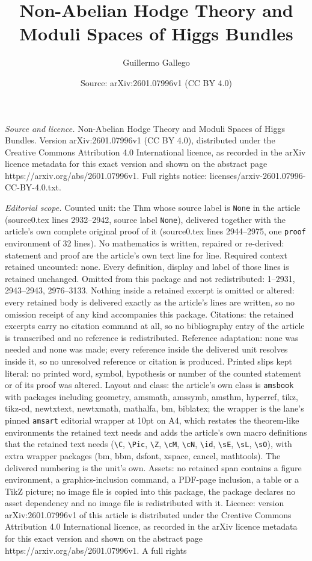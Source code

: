 \documentclass[10pt,a4paper]{amsart}
\title[Non-Abelian Hodge Theory and Moduli Spaces of Higgs Bundles]{Non-Abelian Hodge Theory and Moduli Spaces of Higgs Bundles}
\author{Guillermo Gallego}
\date{Source: arXiv:2601.07996v1 (CC BY 4.0)}
\begin{document}
\maketitle

\noindent\emph{Source and licence.} Non-Abelian Hodge Theory and Moduli Spaces of Higgs Bundles. Version arXiv:2601.07996v1 (CC BY 4.0), distributed under the Creative Commons Attribution 4.0 International licence, as recorded in the arXiv licence metadata for this exact version and shown on the abstract page https://arxiv.org/abs/2601.07996v1. Full rights notice: licenses/arxiv-2601.07996-CC-BY-4.0.txt.\par\smallskip

\noindent\textit{Editorial scope.} Counted unit: the Thm whose source label is \texttt{None} in the article (source0.tex lines 2932--2942, source label \texttt{None}), delivered together with the article's own complete original proof of it (source0.tex lines 2944--2975, one \texttt{proof} environment of 32 lines). No mathematics is written, repaired or re-derived: statement and proof are the article's own text line for line. Required context retained uncounted: none. Every definition, display and label of those lines is retained unchanged. Omitted from this package and not redistributed: 1--2931, 2943--2943, 2976--3133. Nothing inside a retained excerpt is omitted or altered: every retained body is delivered exactly as the article's lines are written, so no omission receipt of any kind accompanies this package. Citations: the retained excerpts carry no citation command at all, so no bibliography entry of the article is transcribed and no reference is redistributed. Reference adaptation: none was needed and none was made; every reference inside the delivered unit resolves inside it, so no unresolved reference or citation is produced. Printed slips kept literal: no printed word, symbol, hypothesis or number of the counted statement or of its proof was altered. Layout and class: the article's own class is \texttt{amsbook} with packages including geometry, amsmath, amssymb, amsthm, hyperref, tikz, tikz-cd, newtxtext, newtxmath, mathalfa, bm, biblatex; the wrapper is the lane's pinned \texttt{amsart} editorial wrapper at 10pt on A4, which restates the theorem-like environments the retained text needs and adds the article's own macro definitions that the retained text needs (\texttt{\textbackslash C}, \texttt{\textbackslash Pic}, \texttt{\textbackslash Z}, \texttt{\textbackslash cM}, \texttt{\textbackslash cN}, \texttt{\textbackslash id}, \texttt{\textbackslash sE}, \texttt{\textbackslash sL}, \texttt{\textbackslash sO}), with extra wrapper packages (bm, bbm, dsfont, xspace, cancel, mathtools). The delivered numbering is the unit's own. Assets: no retained span contains a figure environment, a graphics-inclusion command, a PDF-page inclusion, a table or a TikZ picture; no image file is copied into this package, the package declares no asset dependency and no image file is redistributed with it. Licence: version arXiv:2601.07996v1 of this article is distributed under the Creative Commons Attribution 4.0 International licence, as recorded in the arXiv licence metadata for this exact version and shown on the abstract page https://arxiv.org/abs/2601.07996v1. A full rights 
\end{document}
